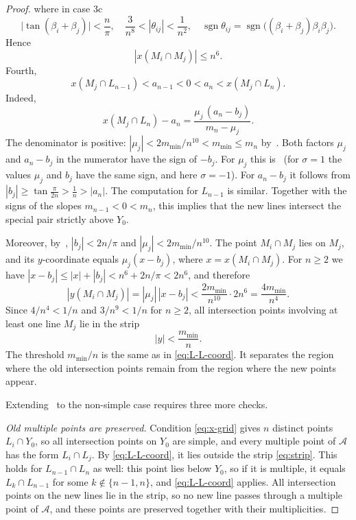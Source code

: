 \begin{proof}
where in case 3c
\begin{equation}\label{eq:theta}
\lvert\tan(\beta_i+\beta_j)\rvert<\frac n\pi,
\quad \frac3{n^8}<|\theta_{ij}|<\frac1{n^2},
\quad \operatorname{sgn}\theta_{ij}=\operatorname{sgn}\bigl((\beta_i+\beta_j)\beta_i\beta_j\bigr).
\end{equation}
Hence
\begin{equation}\label{eq:x-far}
|x(M_i\cap M_j)|\le n^6.
\end{equation}
Fourth,
\begin{equation}\label{eq:special-x}
x(M_j\cap L_{n-1})<a_{n-1}<0<a_n<x(M_j\cap L_n).
\end{equation}
Indeed,
\[
x(M_j\cap L_n)-a_n=\frac{\mu_j\,(a_n-b_j)}{m_n-\mu_j}.
\]
The denominator is positive: $|\mu_j|<2m_{\min}/n^{10}<m_{\min}\le m_n$ by~\cite[(3)]{bbl}.
Both factors $\mu_j$ and $a_n-b_j$ in the numerator have the sign of $-b_j$. For $\mu_j$ this is~\cite[(3)]{bbl} (for $\sigma=1$ the values $\mu_j$ and $b_j$ have the same sign, and here $\sigma=-1$). For $a_n-b_j$ it follows from $|b_j|\ge\tan\frac{\pi}{2n}>\frac1n>|a_n|$.
The computation for $L_{n-1}$ is similar.
Together with the signs of the slopes $m_{n-1}<0<m_n$, this implies that the new lines intersect the special pair strictly above $Y_0$.

Moreover, by~\cite[(3)]{bbl}, $|b_j|<2n/\pi$ and $|\mu_j|<2m_{\min}/n^{10}$.
The point $M_i\cap M_j$ lies on $M_j$, and its $y$-coordinate equals $\mu_j(x-b_j)$, where $x=x(M_i\cap M_j)$. For $n\ge2$ we have $|x-b_j|\le|x|+|b_j|<n^6+2n/\pi<2n^6$, and therefore
\[
|y(M_i\cap M_j)|=|\mu_j|\,|x-b_j|
<\frac{2m_{\min}}{n^{10}}\cdot2n^6=\frac{4m_{\min}}{n^4}.
\]
Since $4/n^4<1/n$ and $3/n^9<1/n$ for $n\ge2$, all intersection points involving at least one line $M_j$ lie in the strip
\begin{equation}\label{eq:strip}
|y|<\frac{m_{\min}}n.
\end{equation}
The threshold $m_{\min}/n$ is the same as in \eqref{eq:L-L-coord}. It separates the region where the old intersection points remain from the region where the new points appear.

Extending~\cite{bbl} to the non-simple case requires three more checks.

\emph{Old multiple points are preserved.}
Condition \eqref{eq:x-grid} gives $n$ distinct points $L_i\cap Y_0$, so all intersection points on $Y_0$ are simple, and every multiple point of $\mathcal A$ has the form $L_i\cap L_j$.
By \eqref{eq:L-L-coord}, it lies outside the strip \eqref{eq:strip}.
This holds for $L_{n-1}\cap L_n$ as well: this point lies below $Y_0$, so if it is multiple, it equals $L_k\cap L_{n-1}$ for some $k\notin\{n-1,n\}$, and \eqref{eq:L-L-coord} applies.
All intersection points on the new lines lie in the strip, so no new line passes through a multiple point of $\mathcal A$, and these points are preserved together with their multiplicities.


\end{proof}
